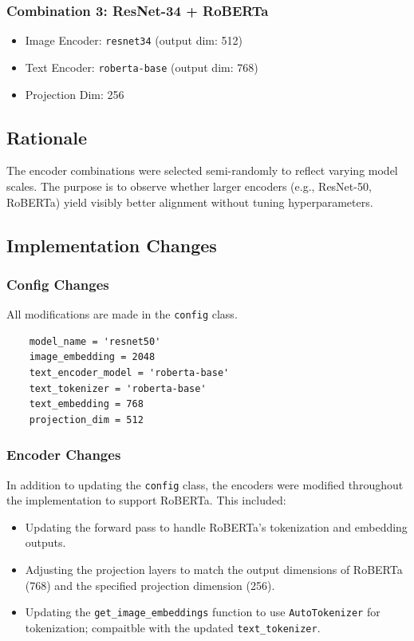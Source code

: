 \documentclass[11pt]{article}
\begin{document}
\subsubsection*{Combination 3: ResNet-34 + RoBERTa}
\begin{itemize}
    \item Image Encoder: \texttt{resnet34} (output dim: 512)
    \item Text Encoder: \texttt{roberta-base} (output dim: 768)
    \item Projection Dim: 256
\end{itemize}

\subsection{Rationale}
The encoder combinations were selected semi-randomly to reflect varying model scales. The purpose is to observe whether larger encoders (e.g., ResNet-50, RoBERTa) yield visibly better alignment without tuning hyperparameters.

\subsection{Implementation Changes}

\subsubsection*{Config Changes}
All modifications are made in the \texttt{config} class.

\begin{verbatim}
    model_name = 'resnet50'
    image_embedding = 2048
    text_encoder_model = 'roberta-base'
    text_tokenizer = 'roberta-base'
    text_embedding = 768
    projection_dim = 512
\end{verbatim}

\subsubsection*{Encoder Changes}
In addition to updating the \texttt{config} class, the encoders were modified throughout the implementation to support RoBERTa. This included:

\begin{itemize}
    \item Updating the forward pass to handle RoBERTa's tokenization and embedding outputs.
    \item Adjusting the projection layers to match the output dimensions of RoBERTa (768) and the specified projection dimension (256).
    \item Updating the \texttt{get\_image\_embeddings} function to use \texttt{AutoTokenizer} for tokenization; compaitble with the updated \texttt{text\_tokenizer}.
\end{itemize}
\end{document}
